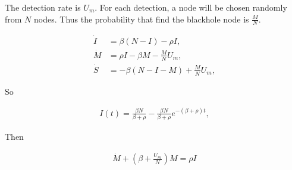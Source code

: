 %
The detection rate is $U_{m}$.
For each detection, a node will be chosen randomly from $N$ nodes.
Thus the probability that find the blackhole node is $\frac{M}{N}$.
\begin{small}
\begin{equation}
\nonumber
\begin{aligned}
\dot{I} &= \beta (N-I) - \rho I,\\
\dot{M} &= \rho I - \beta M - \frac{M}{N} U_{m},\\
\dot{S} &= - \beta (N-I-M) + \frac{M}{N} U_{m},
\end{aligned}
\end{equation}
\end{small}
So
\begin{small}
\begin{equation}
\nonumber
\begin{aligned}
I(t) = \frac{ \beta N }{ \beta + \rho } - \frac{ \beta N }{ \beta + \rho } e^{-(\beta + \rho)t},
\end{aligned}
\end{equation}
\end{small}
Then
\begin{small}
\begin{equation}
\nonumber
\begin{aligned}
\dot{M} + (\beta + \frac{U_{m}}{N})M = \rho I
\end{aligned}
\end{equation}
\end{small}

